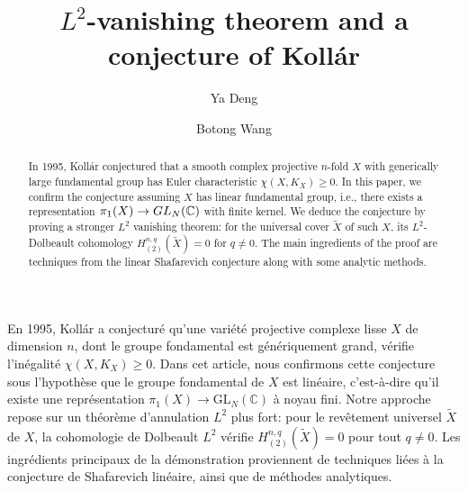 \documentclass[11pt,a4paper,english]{smfart}
\author[Y. Deng]{Ya Deng}
\author[B. Wang]{Botong Wang}
\title[ $L^2$-vanishing theorem and a conjecture of Koll\'ar]{$L^2$-vanishing theorem 
	and a conjecture of Koll\'ar}
\theoremstyle{plain}
\theoremstyle{definition}
\theoremstyle{plain}
\newcommand\GL{\mathrm{GL}}
\def\bC{\mathbb{C}}
\begin{document}
 
	
	\begin{abstract}
	In 1995, Koll\'ar conjectured that   a smooth complex projective \(n\)-fold \(X\) with generically large fundamental group has  Euler characteristic \(\chi(X, K_X)\geq 0\).      In this paper, we confirm  the conjecture assuming \(X\) has  linear fundamental group, i.e., there exists a  representation \(\pi_1(X)\to {\rm GL}_N(\mathbb{C})\) with finite kernel.  We deduce the conjecture by proving a stronger \(L^2\) vanishing theorem: for the universal cover \(\widetilde{X}\) of such \(X\), its   \(L^2\)-Dolbeault cohomology \(H_{(2)}^{n,q}(\widetilde{X})=0\) for  \(q\neq 0\).     The main ingredients of the proof are techniques from the linear Shafarevich conjecture along with  some analytic methods. 



	\end{abstract}
	\begin{altabstract}
		En 1995, Kollár a conjecturé qu’une variété projective complexe lisse \(X\) de dimension \(n\), dont le groupe fondamental est génériquement  grand, vérifie l’inégalité \( \chi(X, K_X) \geq 0 \). Dans cet article, nous confirmons cette conjecture sous l’hypothèse que le groupe fondamental de \(X\) est linéaire, c’est-à-dire qu’il existe une représentation \( \pi_1(X) \to \mathrm{GL}_N(\mathbb{C}) \) à noyau fini. Notre approche repose sur un théorème d’annulation \(L^2\) plus fort: pour le revêtement universel \( \widetilde{X} \) de \( X \), la cohomologie de Dolbeault \(L^2\) vérifie \( H_{(2)}^{n,q}(\widetilde{X}) = 0 \) pour tout \( q \neq 0 \). Les ingrédients principaux de la démonstration proviennent de techniques liées à la conjecture de Shafarevich linéaire, ainsi que de méthodes analytiques.
	\end{altabstract}
	\maketitle
	\tableofcontents
\end{document}
